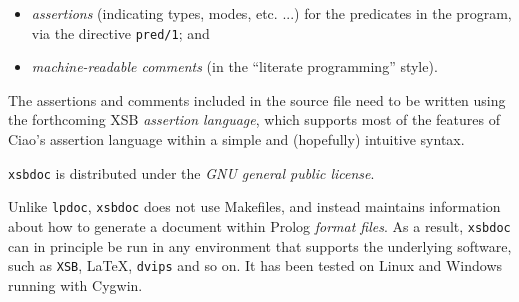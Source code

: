 \begin{itemize}

\item {\em assertions} (indicating types, modes, etc. ...) for the
predicates in the program, via the directive {\tt pred/1}; and

\item {\em machine-readable comments} (in the ``literate programming''
style).

\end{itemize}

The assertions and comments included in the source file need to be
written using the forthcoming XSB {\em assertion language}, which
supports most of the features of Ciao's assertion language within a
simple and (hopefully) intuitive syntax.

{\tt xsbdoc} is distributed under the {\em GNU general public
license}.

Unlike {\tt lpdoc}, {\tt xsbdoc} does not use Makefiles, and instead
maintains information about how to generate a document within Prolog
{\em format files}.  As a result, {\tt xsbdoc} can in principle be run
in any environment that supports the underlying software, such as
{\tt XSB}, \LaTeX, {\tt dvips} and so on.  It has been tested on
Linux and Windows running with Cygwin.

